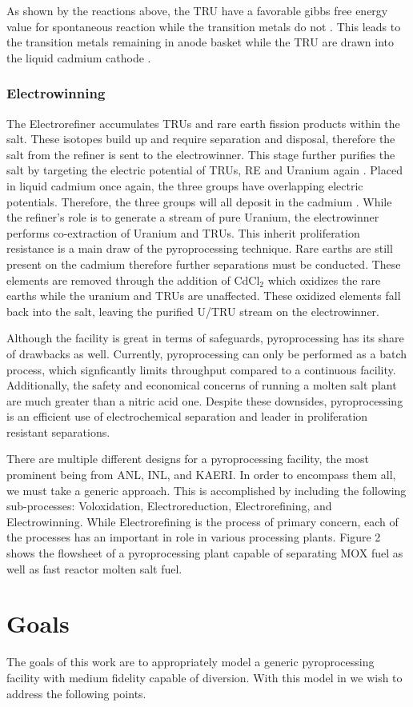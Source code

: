 As shown by the reactions above, the TRU have a favorable gibbs free energy value for spontaneous reaction while the transition metals do not \cite{supy}.
This leads to the transition metals remaining in anode basket while the TRU are drawn into the liquid cadmium cathode \cite{lee_korean_2011}.


\subsubsection{Electrowinning}
The Electrorefiner accumulates TRUs and rare earth fission products within the salt.
These isotopes build up and require separation and disposal, therefore the salt from the refiner is sent to the electrowinner.
This stage further purifies the salt by targeting the electric potential of TRUs, RE and Uranium again \cite{lee_korean_2011,organisation}.
Placed in liquid cadmium once again, the three groups have overlapping electric potentials.
Therefore, the three groups will all deposit in the cadmium \cite{lee_korean_2011}. 
While the refiner's role is to generate a stream of pure Uranium, the electrowinner performs co-extraction of Uranium and TRUs.
This inherit proliferation resistance is a main draw of the pyroprocessing technique.
Rare earths are still present on the cadmium therefore further separations must be conducted.
These elements are removed through the addition of CdCl$_2$ which oxidizes the rare earths while the uranium and TRUs are unaffected.
These oxidized elements fall back into the salt, leaving the purified U/TRU stream on the electrowinner.


Although the facility is great in terms of safeguards, pyroprocessing has its share of drawbacks as well.
Currently, pyroprocessing can only be performed as a batch process, which signficantly limits throughput compared to a continuous facility. 
Additionally, the safety and economical concerns of running a molten salt plant are much greater than a nitric acid one.
Despite these downsides, pyroprocessing is an efficient use of electrochemical separation and leader in proliferation resistant separations.

There are multiple different designs for a pyroprocessing facility, the most prominent being from ANL, INL, and KAERI. In order to encompass them all, we must take a generic approach. This is accomplished by including the following sub-processes: Voloxidation, Electroreduction, Electrorefining, and Electrowinning. While Electrorefining is the process of primary concern, each of the processes has an important in role in various processing plants. Figure 2 shows the flowsheet of a pyroprocessing plant capable of separating MOX fuel as well as fast reactor molten salt fuel.

\section{Goals}

The goals of this work are to appropriately model a generic pyroprocessing facility with medium fidelity capable of diversion. With this model
in \Cyclus we wish to address the following points. 